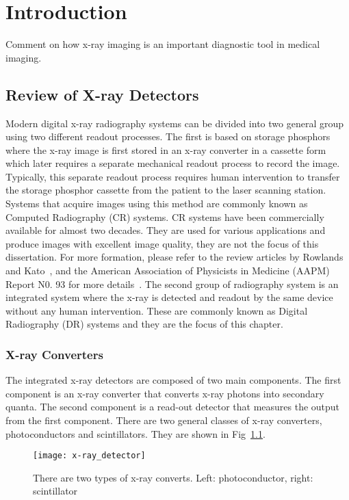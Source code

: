 \chapter{Introduction}
\label{chap:intro}

Comment on how x-ray imaging is an important diagnostic tool in medical imaging.  

\section{Review of X-ray Detectors}
\label{sect:review_x-ray_det}
Modern digital x-ray radiography systems can be divided into two general group using two different readout processes.  The first is based on storage phosphors where the x-ray image is first stored in an x-ray converter in a cassette form which later requires a separate mechanical readout process to record the image.  Typically, this separate readout process requires human intervention to transfer the storage phosphor cassette from the patient to the laser scanning station.  Systems that acquire images using this method are commonly known as Computed Radiography (CR) systems.  CR systems have been commercially available for almost two decades.  They are used for various applications and produce images with excellent image quality, they are not the focus of this dissertation.  For more formation, please refer to the review articles by Rowlands~\citep{Rowlands2002} and Kato~\citep{kato1994}, and the American Association of Physicists in Medicine (AAPM) Report N0. 93 for more details~\citep{AAPM93}.  The second group of radiography system is an integrated system where the x-ray is detected and readout by the same device without any human intervention.  These are commonly known as Digital Radiography (DR) systems and they are the focus of this chapter.

\subsection{X-ray Converters}
\label{subsect:x-ray_converters}
The integrated x-ray detectors are composed of two main components.  The first component is an x-ray converter that converts x-ray photons into secondary quanta.  The second component is a read-out detector that measures the output from the first component.  There are two general classes of x-ray converters, photoconductors and scintillators.  They are shown in Fig~\ref{fig:x-ray_detector}.

\begin{figure}[ht]
\centering
\texttt{[image: x-ray\_detector]}
\caption{There are two types of x-ray converts.  Left: photoconductor, right: scintillator}
\label{fig:x-ray_detector}
\end{figure}

